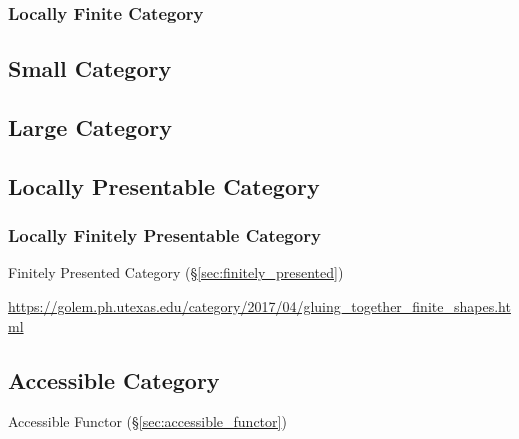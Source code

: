 \subsubsection{Locally Finite Category}
\label{sec:locally_finite_category}



\subsection{Small Category}\label{sec:small_category}

\subsection{Large Category}\label{sec:large_category}

\subsection{Locally Presentable Category}\label{sec:locally_presentable}



\subsubsection{Locally Finitely Presentable Category}
\label{sec:lfp_category}

\fist Finitely Presented Category (\S\ref{sec:finitely_presented})

\url{https://golem.ph.utexas.edu/category/2017/04/gluing_together_finite_shapes.html}



\subsection{Accessible Category}\label{sec:accessible_category}

Accessible Functor (\S\ref{sec:accessible_functor})



